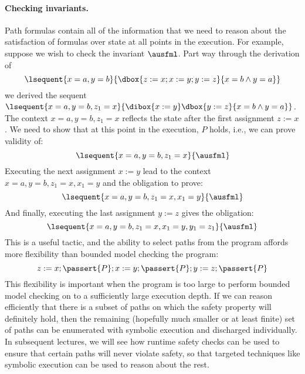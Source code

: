 \documentclass[11pt,twoside]{scrartcl}
\begin{document}
\paragraph{Checking invariants.}
Path formulas contain all of the information that we need to reason about the satisfaction of formulas over state at all points in the execution. For example, suppose we wish to check the invariant $\ausfml$. Part way through the derivation of 
\[
\lsequent{x=a,y=b} {\dbox{z:=x; x:=y; y:=z}{x=b\land y=a}}
\]
we derived the sequent $\lsequent{x=a,y=b,z_1=x}{\dibox{x:=y}\dbox{y:=z}{x=b \land y=a}}$. The context $x=a,y=b,z_1=x$ reflects the state after the first assignment $z:=x$. We need to show that at this point in the execution, $P$ holds, i.e., we can prove validity of:
\[
\lsequent{x=a,y=b,z_1=x}{\ausfml}
\]
Executing the next assignment $x:=y$ lead to the context $x=a,y=b,z_1=x,x_1=y$ and the obligation to prove:
\[
\lsequent{x=a,y=b,z_1=x,x_1=y}{\ausfml}
\]
And finally, executing the last assignment $y:=z$ gives the obligation:
\[
\lsequent{x=a,y=b,z_1=x,x_1=y,y_1=z_1}{\ausfml}
\]
This is a useful tactic, and the ability to select paths from the program affords more flexibility than bounded model checking the program:
\[
z:=x;\passert{P};x:=y;\passert{P};y:=z;\passert{P}
\]
This flexibility is important when the program is too large to perform bounded model checking on to a sufficiently large execution depth. If we can reason efficiently that there is a subset of paths on which the safety property will definitely hold, then the remaining (hopefully much smaller or at least finite) set of paths can be enumerated with symbolic execution and discharged individually. In subsequent lectures, we will see how runtime safety checks can be used to ensure that certain paths will never violate safety, so that targeted techniques like symbolic execution can be used to reason about the rest.


\end{document}
